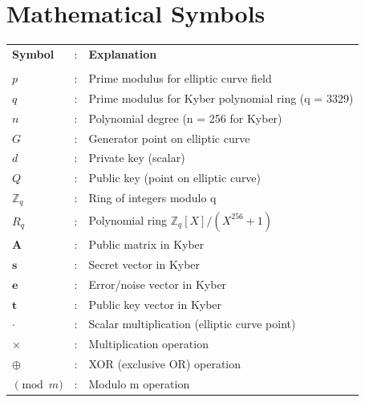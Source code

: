 \section*{Mathematical Symbols}
\begin{tabular}{lcl}
    \textbf{Symbol} &:& \textbf{Explanation}\\
    \\
    $p$ &:& Prime modulus for elliptic curve field\\
    $q$ &:& Prime modulus for Kyber polynomial ring (q = 3329)\\
    $n$ &:& Polynomial degree (n = 256 for Kyber)\\
    $G$ &:& Generator point on elliptic curve\\
    $d$ &:& Private key (scalar)\\
    $Q$ &:& Public key (point on elliptic curve)\\
    $\mathbb{Z}_q$ &:& Ring of integers modulo q\\
    $R_q$ &:& Polynomial ring $\mathbb{Z}_q[X]/(X^{256} + 1)$\\
    $\mathbf{A}$ &:& Public matrix in Kyber\\
    $\mathbf{s}$ &:& Secret vector in Kyber\\
    $\mathbf{e}$ &:& Error/noise vector in Kyber\\
    $\mathbf{t}$ &:& Public key vector in Kyber\\
    $\cdot$ &:& Scalar multiplication (elliptic curve point)\\
    $\times$ &:& Multiplication operation\\
    $\oplus$ &:& XOR (exclusive OR) operation\\
    $\pmod{m}$ &:& Modulo m operation\\
\end{tabular}

\clearpage